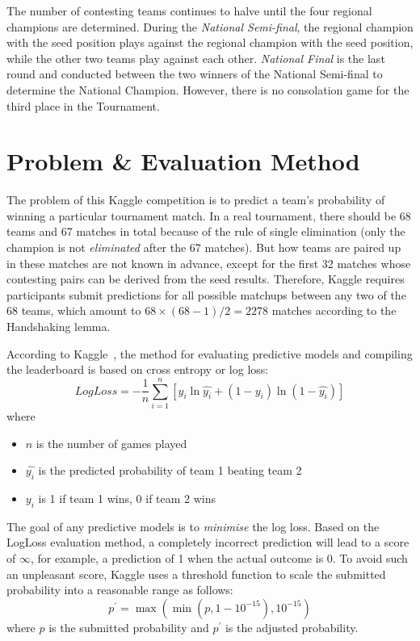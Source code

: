 The number of contesting teams continues to halve until the four regional champions are determined. During the \emph{National Semi-final}, the regional champion with the  seed position plays against the regional champion with the  seed position, while the other two teams play against each other. \emph{National Final} is the last round and conducted between the two winners of the National Semi-final to determine the National Champion. However, there is no consolation game for the third place in the Tournament.

\section{Problem \& Evaluation Method}
The problem of this Kaggle competition is to predict a team's probability of winning a particular tournament match. In a real tournament, there should be 68 teams and 67 matches in total because of the rule of single elimination (only the champion is not \emph{eliminated} after the 67 matches). But how teams are paired up in these matches are not known in advance, except for the first 32 matches whose contesting pairs can be derived from the seed results. Therefore, Kaggle requires participants submit predictions for all possible matchups between any two of the 68 teams, which amount to $68 \times (68 - 1) / 2 = 2278$ matches according to the Handshaking lemma. 

According to Kaggle~\cite{KG16}, the method for evaluating predictive models and compiling the leaderboard is based on cross entropy or log loss:
\begin{equation}
LogLoss = -\frac{1}{n}\sum_{i=1}^{n}[y_{i}\ln{\hat{y_{i}}} + (1 - y_{i})\ln(1 - \hat{y_{i}})]
\end{equation}
where
\begin{itemize}
	\item $n$ is the number of games played 
	\item $\hat{y_{i}}$ is the predicted probability of team 1 beating team 2
	\item $y_{i}$ is 1 if team 1 wins, 0 if team 2 wins
\end{itemize}

The goal of any predictive models is to \emph{minimise} the log loss. Based on the LogLoss evaluation method, a completely incorrect prediction will lead to a score of $\infty$, for example, a prediction of 1 when the actual outcome is 0. To avoid such an unpleasant score, Kaggle uses a threshold function to scale the submitted probability into a reasonable range as follows: 
\begin{equation}
p^{\prime} = \max(\min(p, 1 - 10^{-15}), 10^{-15})
\end{equation}
where $p$ is the submitted probability and $p^{\prime}$ is the adjusted probability. 

